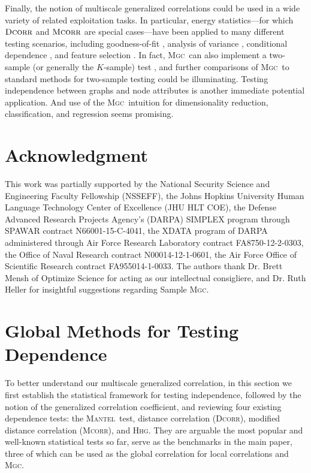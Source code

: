 \documentclass[11pt]{article}
\providecommand{\sct}[1]{{\normalfont\textsc{#1}}}
\newcommand{\Mgc}{\sct{Mgc}}
\newcommand{\Hhg}{\sct{Hhg}}
\newcommand{\Dcorr}{\sct{Dcorr}}
\newcommand{\Mcorr}{\sct{Mcorr}}
\newcommand{\Mantel}{\sct{Mantel}}
\begin{document}
Finally, the notion of multiscale generalized correlations could be used in a wide variety of related exploitation tasks.  In particular, energy statistics---for which $\Dcorr$ and $\Mcorr$ are special cases---have been applied to many different testing scenarios, including goodness-of-fit  \cite{Szekely2005}, analysis of variance  \cite{Rizzo2010}, conditional dependence  \cite{Szekely2014,Wang2015},   and feature selection \cite{LiZhongZhu2012,Zhong2015}.     
In fact, \Mgc~can also implement a two-sample (or generally the $K$-sample) test \cite{Szekely2004, heller2016consistent}, and further comparisons of \Mgc~to standard methods for two-sample testing could be illuminating.
Testing independence between graphs and node attributes \cite{Fosdick2015} is another immediate potential application.  And use of the \Mgc~intuition for dimensionality reduction, classification, and regression seems promising.



\clearpage
\pagestyle{plain}




\section*{Acknowledgment}
This work was partially supported by the
%
National Security Science and Engineering Faculty Fellowship (NSSEFF),
%
the Johns Hopkins University Human Language Technology Center of Excellence (JHU HLT COE),  the
%
Defense Advanced Research Projects Agency's (DARPA) SIMPLEX program through SPAWAR contract N66001-15-C-4041,
%
the XDATA program of DARPA administered through Air Force Research Laboratory contract FA8750-12-2-0303,
%
the Office of Naval Research contract N00014-12-1-0601,
%
the Air Force Office of Scientific Research contract FA955014-1-0033. The authors thank Dr. Brett Mensh of Optimize Science for acting as our intellectual consigliere, and Dr. Ruth Heller for insightful suggestions regarding Sample \Mgc.

\clearpage
\appendix
\setcounter{figure}{0}
\renewcommand\thefigure{S\arabic{figure}}
\renewcommand{\thesubsection}{\thesection.\Roman{subsection}}

\section{Global Methods for Testing Dependence}
\label{appen:methods}
To better understand our multiscale generalized correlation, in this section we first establish the statistical framework for testing independence, followed by the notion of the generalized correlation coefficient, and reviewing four existing dependence tests: the \Mantel~test, distance correlation (\Dcorr), modified distance correlation (\Mcorr), and \Hhg. They are arguable the most popular and well-known statistical tests so far, serve as the benchmarks in the main paper, three of which can be used as the global correlation for local correlations and \Mgc.
\end{document}
